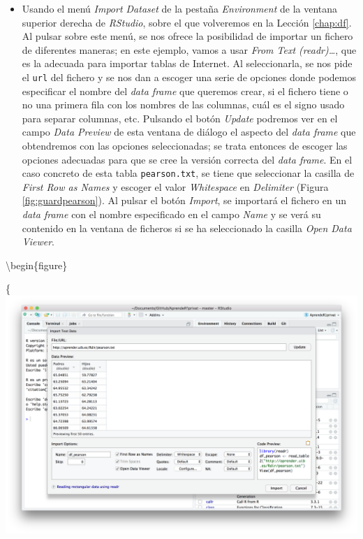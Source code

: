 \documentclass[]{book}
\providecommand{\tightlist}{%
  \setlength{\itemsep}{0pt}\setlength{\parskip}{0pt}}
\theoremstyle{definition}
\theoremstyle{definition}
\theoremstyle{definition}
\theoremstyle{remark}
\begin{document}
\begin{itemize}
\tightlist
\item
  Usando el menú \emph{Import Dataset} \label{page:import} de la pestaña \emph{Environment} de la ventana superior derecha de \emph{RStudio}, sobre el que volveremos en la Lección \ref{chap:df}. Al pulsar sobre este menú, se nos ofrece la posibilidad de importar un fichero de diferentes maneras; en este ejemplo, vamos a usar \emph{From Text (readr)\ldots{}}, que es la adecuada para importar tablas de Internet. Al seleccionarla, se nos pide el \texttt{url} del fichero y se nos dan a escoger una serie de opciones donde podemos especificar el nombre del \emph{data frame} que queremos crear, si el fichero tiene o no una primera fila con los nombres de las columnas, cuál es el signo usado para separar columnas, etc. Pulsando el botón \emph{Update} podremos ver en el campo \emph{Data Preview} de esta ventana de diálogo el aspecto del \emph{data frame} que obtendremos con las opciones seleccionadas; se trata entonces de escoger las opciones adecuadas para que se cree la versión correcta del \emph{data frame}.
  En el caso concreto de esta tabla \texttt{pearson.txt}, se tiene que seleccionar la casilla de \emph{First Row as Names} y escoger el valor \emph{Whitespace} en \emph{Delimiter} (Figura \ref{fig:guardpearson}). Al pulsar el botón \emph{Import}, se importará el fichero en un \emph{data frame} con el nombre especificado en el campo \emph{Name} y se verá su contenido en la ventana de ficheros si se ha seleccionado la casilla \emph{Open Data Viewer}.
\end{itemize}

\textbackslash{}begin\{figure\}

\{\centering \includegraphics{AprendeR-Parte-I_files/figure-html/guardpearson}
\end{document}
